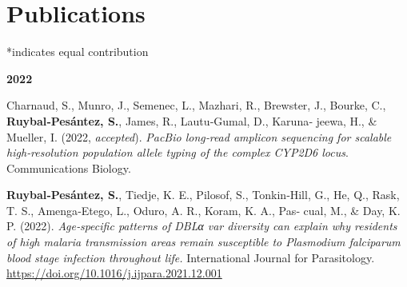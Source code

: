 \documentclass[11pt,a4paper,]{awesome-cv}
\begin{document}
\begin{cvhonors}
\end{cvhonors}

\newpage

\hypertarget{publications}{%
\section{Publications}\label{publications}}

\footnotesize

*indicates equal contribution

\setlength{\leftskip}{0cm}

\textbf{2022}

\setlength{\leftskip}{1cm}

Charnaud, S., Munro, J., Semenec, L., Mazhari, R., Brewster, J., Bourke,
C., \textbf{Ruybal‐Pesántez, S.}, James, R., Lautu‐Gumal, D., Karuna‐
jeewa, H., \& Mueller, I. (2022, \emph{accepted}). \emph{PacBio
long‐read amplicon sequencing for scalable high‐resolution population
allele typing of the complex CYP2D6 locus}. Communications Biology.

\textbf{Ruybal‐Pesántez, S.}, Tiedje, K. E., Pilosof, S., Tonkin‐Hill,
G., He, Q., Rask, T. S., Amenga‐Etego, L., Oduro, A. R., Koram, K. A.,
Pas‐ cual, M., \& Day, K. P. (2022). \emph{Age‐specific patterns of DBLα
var diversity can explain why residents of high malaria transmission
areas remain susceptible to Plasmodium falciparum blood stage infection
throughout life.} International Journal for Parasitology.
\url{https://doi.org/10.1016/j.ijpara.2021.12.001}
\end{document}
